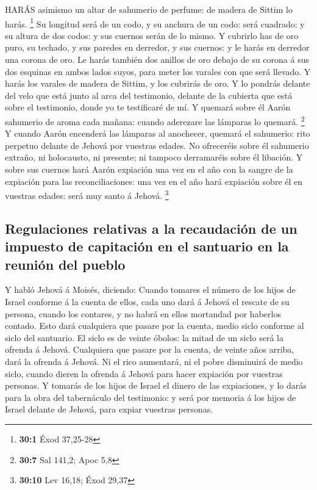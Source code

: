  HARÁS asimismo un altar de sahumerio de perfume: de madera
de Sittim lo harás. \footnote{\textbf{30:1} Éxod 37,25-28} 
Su longitud será de un codo, y su anchura de un codo: será cuadrado: y
su altura de dos codos: y sus cuernos serán de lo mismo.  Y
cubrirlo has de oro puro, su techado, y sus paredes en derredor, y sus
cuernos: y le harás en derredor una corona de oro.  Le harás
también dos anillos de oro debajo de su corona á sus dos esquinas en
ambos lados suyos, para meter los varales con que será llevado.
 Y harás los varales de madera de Sittim, y los cubrirás de
oro.  Y lo pondrás delante del velo que está junto al arca
del testimonio, delante de la cubierta que está sobre el testimonio,
donde yo te testificaré de mí.  Y quemará sobre él Aarón
sahumerio de aroma cada mañana: cuando aderezare las lámparas lo
quemará. \footnote{\textbf{30:7} Sal 141,2; Apoc 5,8}  Y
cuando Aarón encenderá las lámparas al anochecer, quemará el sahumerio:
rito perpetuo delante de Jehová por vuestras edades.  No
ofreceréis sobre él sahumerio extraño, ni holocausto, ni presente; ni
tampoco derramaréis sobre él libación.  Y sobre sus cuernos
hará Aarón expiación una vez en el año con la sangre de la expiación
para las reconciliaciones: una vez en el año hará expiación sobre él en
vuestras edades: será muy santo á Jehová. \footnote{\textbf{30:10} Lev
  16,18; Éxod 29,37}

\hypertarget{regulaciones-relativas-a-la-recaudaciuxf3n-de-un-impuesto-de-capitaciuxf3n-en-el-santuario-en-la-reuniuxf3n-del-pueblo}{%
\subsection{Regulaciones relativas a la recaudación de un impuesto de
capitación en el santuario en la reunión del
pueblo}\label{regulaciones-relativas-a-la-recaudaciuxf3n-de-un-impuesto-de-capitaciuxf3n-en-el-santuario-en-la-reuniuxf3n-del-pueblo}}

 Y habló Jehová á Moisés, diciendo:  Cuando
tomares el número de los hijos de Israel conforme á la cuenta de ellos,
cada uno dará á Jehová el rescate de su persona, cuando los contares, y
no habrá en ellos mortandad por haberlos contado.  Esto
dará cualquiera que pasare por la cuenta, medio siclo conforme al siclo
del santuario. El siclo es de veinte óbolos: la mitad de un siclo será
la ofrenda á Jehová.  Cualquiera que pasare por la cuenta,
de veinte años arriba, dará la ofrenda á Jehová.  Ni el
rico aumentará, ni el pobre disminuirá de medio siclo, cuando dieren la
ofrenda á Jehová para hacer expiación por vuestras personas.
 Y tomarás de los hijos de Israel el dinero de las
expiaciones, y lo darás para la obra del tabernáculo del testimonio: y
será por memoria á los hijos de Israel delante de Jehová, para expiar
vuestras personas.

